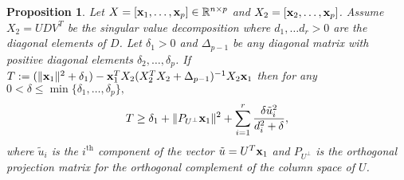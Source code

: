 \documentclass[noinfoline,11pt]{imsart}
\numberwithin{equation}{section}
\theoremstyle{plain}
\newtheorem{prop}{Proposition}[section]
\newcommand{\lmDelta}{\Delta}
\newcommand{\lmdelta}{\delta}
\newcommand{\lmlambda}{\lambda}
\newcommand{\lmX}{X}
\newcommand{\lmU}{U}
\newcommand{\lmu}{u}
\newcommand{\lmD}{D}
\newcommand{\R}{\mathbb{R}}
\newcommand{\norm}[1]{ \Vert #1 \Vert }
\newcommand{\lmA}{A}
\newcommand{\lma}{a}
\newcommand{\lmabf}{{\bf a}}
\newcommand{\lmxbf}{{\bf x}}
\begin{document}
%
%

\begin{prop} \label{result:lm2} 
Let  $\lmX=\left[ \lmxbf_1, \ldots , \lmxbf_p   \right]\in \R^{n\times p}$ and $\lmX_2=\left[ \lmxbf_2, \ldots , \lmxbf_p   \right]$.
Assume  $\lmX_{2}=UDV^T$ be the singular value decomposition  where $d_1, \ldots d_r>0$ are the diagonal elements of $\lmD$.  Let $\lmdelta_1>0$ and $\lmDelta_{p-1}$ be any diagonal matrix with positive diagonal elements $\lmdelta_2, \ldots, \lmdelta_p$.  If  
$T:= (\norm{\lmxbf_1}^2+\lmdelta_1)- \lmxbf_1^T \lmX_2 (\lmX_{2}^T\lmX_2+\lmDelta_{p-1})^{-1}\lmX_2\lmxbf_1$ then  for any $0<\lmdelta\leq \min\{ \lmdelta_1, \ldots, \lmdelta_p \},$
\begin{eqnarray}
T\geq \delta_1+\norm{P_{U^\perp}\lmxbf_1}^2+\sum_{i=1}^{r} \frac{\lmdelta\tilde{\lmu}^2_i}{d_i^2+\lmdelta},\nonumber
\end{eqnarray}
%
where $\tilde{\lmu}_i$ is the $i^{\text{th}}$ component of the vector $\tilde{\lmu}=\lmU^T\lmxbf_{1}$ and $ P_{\lmU^\perp}  $ is the orthogonal projection matrix for the orthogonal complement of the column space of $\lmU$.
\end{prop}
\end{document}

